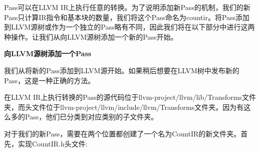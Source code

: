 
Pass可以在LLVM IR上执行任意的转换。为了说明添加新Pass的机制，我们的新Pass只计算IR指令和基本块的数量，我们将这个Pass命名为countir。将Pass添加到LLVM源树或作为一个独立的Pass略有不同，因此我们将在以下部分中进行这两种操作。让我们从向LLVM源树添加一个新的Pass开始。\par

\hspace*{\fill} \par %
\textbf{向LLVM源树添加一个Pass}

我们从将新的Pass添加到LLVM源开始。如果稍后想要在LLVM树中发布新的Pass，这是一种正确的方法。\par

在LLVM IR上执行转换的Pass的源代码位于llvm-project/llvm/lib/Transforms文件夹，而头文件位于llvm-project/llvm/include/llvm/Transforms文件夹。因为有这么多的Pass，他们已分类到对应类别的子文件夹。\par

对于我们的新Pass，需要在两个位置都创建了一个名为CountIR的新文件夹。首先，实现CountIR.h头文件:\par

